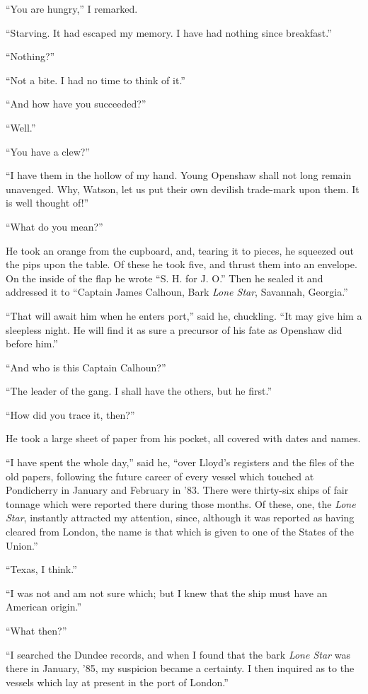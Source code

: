 “You are hungry,” I remarked.

“Starving. It had escaped my memory. I have had nothing
since breakfast.”

“Nothing?”

“Not a bite. I had no time to think of it.”

“And how have you succeeded?”

“Well.”

“You have a clew?”

“I have them in the hollow of my hand. Young Openshaw
shall not long remain unavenged. Why, Watson, let us put
their own devilish trade-mark upon them. It is well thought
of!”

“What do you mean?”

He took an orange from the cupboard, and, tearing it to
pieces, he squeezed out the pips upon the table. Of these he
took five, and thrust them into an envelope. On the inside of
the flap he wrote “S. H. for J. O.” Then he sealed it and
addressed it to “Captain James Calhoun, Bark \textit{Lone Star},
Savannah, Georgia.”

“That will await him when he enters port,” said he, chuckling.
“It may give him a sleepless night. He will find it as
sure a precursor of his fate as Openshaw did before him.”

“And who is this Captain Calhoun?”

“The leader of the gang. I shall have the others, but he
first.”

“How did you trace it, then?”

He took a large sheet of paper from his pocket, all covered
with dates and names.

“I have spent the whole day,” said he, “over Lloyd’s registers
and the files of the old papers, following the future career
of every vessel which touched at Pondicherry in January
and February in ’83. There were thirty-six ships of fair tonnage
which were reported there during those months. Of
these, one, the \textit{Lone Star}, instantly attracted my attention,
since, although it was reported as having cleared from London,
the name is that which is given to one of the States of
the Union.”

“Texas, I think.”

“I was not and am not sure which; but I knew that the
ship must have an American origin.”

“What then?”

“I searched the Dundee records, and when I found that the
bark \textit{Lone Star} was there in January, ’85, my suspicion became
a certainty. I then inquired as to the vessels which lay at
present in the port of London.”

